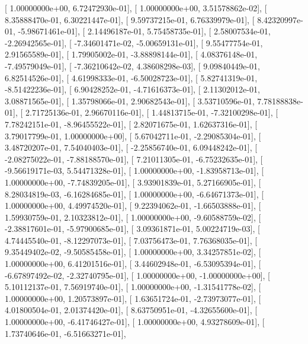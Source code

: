 \documentclass{article}
\begin{document}
       [  1.00000000e+00,   6.72472930e-01],
       [  1.00000000e+00,   3.51578862e-02],
       [  8.35888470e-01,   6.30221447e-01],
       [  9.59737215e-01,   6.76339979e-01],
       [  8.42320997e-01,  -5.98671461e-01],
       [  2.14496187e-01,   5.75458735e-01],
       [  2.58007534e-01,  -2.26942565e-01],
       [ -7.34601471e-02,  -5.00659131e-01],
       [  9.55477754e-01,   2.91565589e-01],
       [  1.79905002e-01,  -3.88898144e-01],
       [  4.08376148e-01,  -7.49579049e-01],
       [ -7.36210642e-02,   4.38608298e-03],
       [  9.09840449e-01,   6.82514526e-01],
       [  4.61998333e-01,  -6.50028723e-01],
       [  5.82741319e-01,  -8.51422236e-01],
       [  6.90428252e-01,  -4.71616373e-01],
       [  2.11302012e-01,   3.08871565e-01],
       [  1.35798066e-01,   2.90682543e-01],
       [  3.53710596e-01,   7.78188838e-01],
       [  2.71725136e-01,   2.96670116e-01],
       [  1.44813715e-01,  -7.32100298e-01],
       [  7.78242151e-01,  -8.96455522e-01],
       [  2.82071675e-01,   1.62637316e-01],
       [  3.79017799e-01,   1.00000000e+00],
       [  5.67042711e-01,  -2.29085304e-01],
       [  3.48720207e-01,   7.54040403e-01],
       [ -2.25856740e-01,   6.09448242e-01],
       [ -2.08275022e-01,  -7.88188570e-01],
       [  7.21011305e-01,  -6.75232635e-01],
       [ -9.56619171e-03,   5.54471328e-01],
       [  1.00000000e+00,  -1.83958713e-01],
       [  1.00000000e+00,  -7.74839205e-01],
       [  3.93901839e-01,   5.27166905e-01],
       [  8.28034819e-03,  -6.16284685e-01],
       [  1.00000000e+00,  -6.64671373e-01],
       [  1.00000000e+00,   4.49974520e-01],
       [  9.22394062e-01,  -1.66503888e-01],
       [  1.59930759e-01,   2.10323812e-01],
       [  1.00000000e+00,  -9.60588759e-02],
       [ -2.38817601e-01,  -5.97900685e-01],
       [  3.09361871e-01,   5.00224719e-03],
       [  4.74445540e-01,  -8.12297073e-01],
       [  7.03756473e-01,   7.76368035e-01],
       [  9.35449402e-02,  -9.50585458e-01],
       [  1.00000000e+00,   3.34257851e-02],
       [  1.00000000e+00,   6.41201516e-01],
       [  3.44602948e-01,  -6.53095394e-01],
       [ -6.67897492e-02,  -2.32740795e-01],
       [  1.00000000e+00,  -1.00000000e+00],
       [  5.10112137e-01,   7.56919740e-01],
       [  1.00000000e+00,  -1.31541778e-02],
       [  1.00000000e+00,   1.20573897e-01],
       [  1.63651724e-01,  -2.73973077e-01],
       [  4.01800504e-01,   2.01374420e-01],
       [  8.63750951e-01,  -4.32655600e-01],
       [  1.00000000e+00,  -6.41746427e-01],
       [  1.00000000e+00,   4.93278609e-01],
       [  1.73740646e-01,  -6.51663271e-01],
\end{document}

